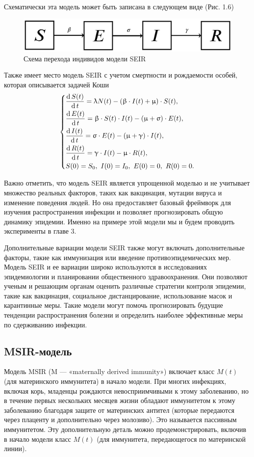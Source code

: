 \documentclass[a4paper, 14pt]{extreport}
\numberwithin{equation}{section}
\renewcommand{\beta}{\upbeta}
\renewcommand{\gamma}{\upgamma}
\renewcommand{\sigma}{\upsigma}
\renewcommand{\lambda}{\uplambda}
\renewcommand{\mu}{\upmu}
\renewcommand{\d}{\operatorname{d}}
\begin{document}
	Схематически эта модель может быть записана в следующем виде (Рис. 1.6)
	\begin{figure}[h]
		\centering
		\includegraphics[scale=0.3]{images/img08}
		\caption{Схема перехода индивидов модели SEIR}
		\label{fig:img08}
	\end{figure}
	
	
	Также имеет место модель SEIR с учетом смертности и рождаемости особей, которая описывается задачей Коши
	\begin{equation}
	\begin{dcases}
		\dfrac {\d S(t)}{\d t} = \lambda N(t) - (\beta \cdot I(t) +\mu)\cdot S(t),\\
	\dfrac {\d E(t)}{\d t} = \beta \cdot S(t)\cdot I(t) - (\mu + \sigma)\cdot E(t),\\
	\dfrac{\d I(t)}{\d t} =\sigma \cdot E(t) - (\mu + \gamma)\cdot I(t),\\
	\dfrac{\d R(t)}{\d t} = \gamma\cdot I(t) - \mu \cdot R(t),\\
	S(0) = S_0,\ I(0) = I_0,\ E(0) = 0,\ R(0) = 0.
	\end{dcases}
	\end{equation}
	
	
	Важно отметить, что модель SEIR является упрощенной моделью и не учитывает множество реальных факторов, таких как вакцинация, мутации вируса и изменение поведения людей. Но она предоставляет базовый фреймворк для изучения распространения инфекции и позволяет прогнозировать общую динамику эпидемии.
	Именно на примере этой модели мы и будем проводить эксперименты в главе 3.
	
	Дополнительные вариации модели SEIR также могут включать дополнительные факторы, такие как иммунизация или введение противоэпидемических мер. Модель SEIR и ее вариации широко используются в исследованиях эпидемиологии и планировании общественного здравоохранения. Они позволяют ученым и решающим органам оценить различные стратегии контроля эпидемии, такие как вакцинация, социальное дистанцирование, использование масок и карантинные меры. Такие модели могут помочь прогнозировать будущие тенденции распространения болезни и определить наиболее эффективные меры по сдерживанию инфекции.
	
	\subsection{MSIR-модель}
	Модель MSIR (M — «maternally derived immunity») включает класс $M(t)$ (для материнского иммунитета) в начало модели. При многих инфекциях, включая корь, младенцы рождаются невосприимчивыми к этому заболеванию, но в течение первых нескольких месяцев жизни обладают иммунитетом к этому заболеванию благодаря защите от материнских антител (которые передаются через плаценту и дополнительно через молозиво). Это называется пассивным иммунитетом. Эту дополнительную деталь можно продемонстрировать, включив в начало модели класс $M(t)$ (для иммунитета, передающегося по материнской линии). 
	
\end{document}
